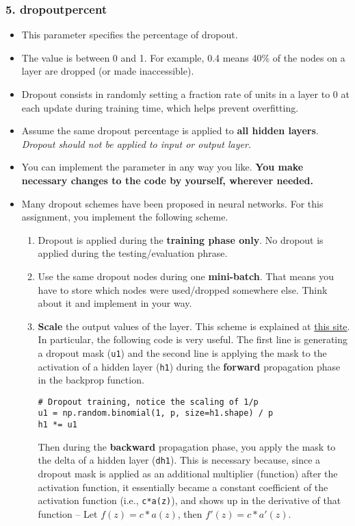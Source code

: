 \documentclass[11pt]{article}
\begin{document}
\subsubsection*{5. dropoutpercent}
\label{sec:orge14d810}
\begin{itemize}
\item This parameter specifies the percentage of dropout.
\item The value is between 0 and 1.  For example, 0.4 means 40\% of the nodes on a layer are dropped (or made inaccessible).
\item Dropout consists in randomly setting a fraction rate of units in a layer to 0 at each update during training time, which helps prevent overfitting.
\item Assume the same dropout percentage is applied to \textbf{all hidden layers}.  \emph{Dropout should not be applied to input or output layer.}
\item You can implement the parameter in any way you like.  \textbf{You make necessary changes to the code by yourself, wherever needed.}
\item Many dropout schemes have been proposed in neural networks.  For this assignment, you implement the following scheme.
\begin{enumerate}
\item Dropout is applied during the \textbf{training phase only}.  No dropout is applied during the testing/evaluation phrase.
\item Use the same dropout nodes during one \textbf{mini-batch}.  That means you have to store which nodes were used/dropped somewhere else.  Think about it and implement in your way.
\item \textbf{Scale} the output values of the layer.  This scheme is explained at \href{https://wiseodd.github.io/techblog/2016/06/25/dropout/}{this site}.  In particular, the following code is very useful. The first line is generating a dropout mask (\texttt{u1}) and the second line is applying the mask to the activation of a hidden layer (\texttt{h1}) during the \textbf{forward} propagation phase in the backprop function.
\begin{verbatim}
# Dropout training, notice the scaling of 1/p
u1 = np.random.binomial(1, p, size=h1.shape) / p
h1 *= u1
\end{verbatim}

Then during the \textbf{backward} propagation phase, you apply the mask to the delta of a hidden layer (\texttt{dh1}).    This is necessary because, since a dropout mask is applied as an additional multiplier (function) after the activation function, it essentially became a constant coefficient of the activation function (i.e., \texttt{c*a(z)}), and shows up in the derivative of that function --  Let \(f(z) = c*a(z)\), then \(f'(z) = c*a'(z)\).


\end{enumerate}
\end{itemize}
\end{document}
